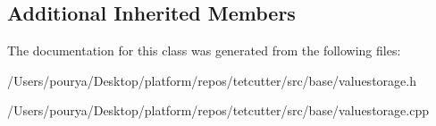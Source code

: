 \subsection*{Additional Inherited Members}


The documentation for this class was generated from the following files\+:\begin{DoxyCompactItemize}
\item 
/\+Users/pourya/\+Desktop/platform/repos/tetcutter/src/base/valuestorage.\+h\item 
/\+Users/pourya/\+Desktop/platform/repos/tetcutter/src/base/valuestorage.\+cpp\end{DoxyCompactItemize}
